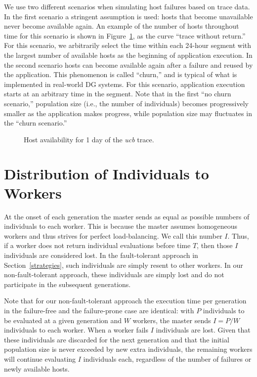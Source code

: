 \documentclass[graybox]{sty/svmult}
\begin{document}
We use two different scenarios when simulating host failures based
on trace data. In the first scenario a stringent assumption is used: hosts
that become unavailable never become available again. An example
of the number of hosts throughout time for this scenario is shown in
Figure~\ref{fig:trazas2}, as the curve ``trace without return.''  For this
scenario, we arbitrarily select the time within each 24-hour segment with
the largest number of available hosts as the beginning of application
execution.  In the second scenario hosts can become available again after a
failure and
reused by the application. This phenomenon is called ``churn,'' and 
is typical of what is implemented in real-world DG systems. For
this scenario, application execution starts at an arbitrary time in
the segment.  Note that in the first ``no churn scenario,'' population
size (i.e., the number of individuals) becomes progressively smaller as the
application makes progress, while population size may fluctuates in the
``churn scenario.''

\begin{figure}
    \begin{center}
    \end{center}
    \caption{\label{fig:trazas2}Host availability for 1 day of the \emph{ucb} trace.}
\end{figure}

\section{Distribution of Individuals to Workers}
\label{distribution-individuals}

At the onset of each generation the master sends as equal as possible
numbers of individuals to each worker.  This is because the master assumes
homogeneous workers and thus strives for perfect load-balancing. We call
this number $I$. Thus, if a worker does not return individual evaluations
before time $T$, then those $I$ individuals are considered lost. In the
fault-tolerant approach in Section~\ref{strategies}, such individuals
are simply resent to other workers. In our non-fault-tolerant approach,
these individuals are simply lost and do not participate in the
subsequent generations. 

Note that for our non-fault-tolerant approach the execution time per
generation in the failure-free and the failure-prone case are
identical: with $P$ individuals to be evaluated at a given generation
and $W$ workers, the master sends $I=P/W$ individuals to
each worker.  When a worker fails $I$ individuals are lost.  Given
that these individuals are discarded for the next generation and that the
initial population size is never exceeded by new extra individuals,
the remaining workers will continue evaluating $I$ individuals each,
regardless of the number of failures or newly available hosts.
\end{document}
